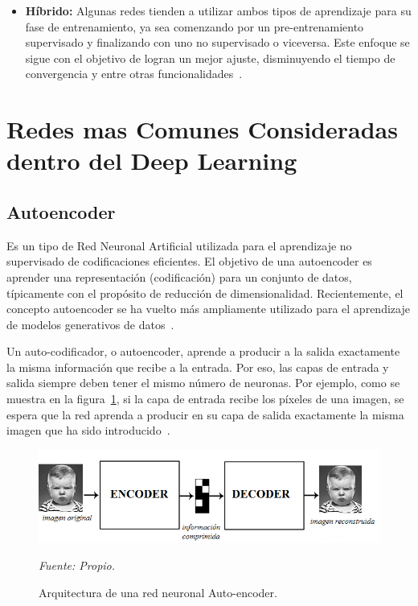 \begin{itemize}
\item \textbf{Híbrido: }
Algunas redes tienden a utilizar ambos tipos de aprendizaje para su fase de entrenamiento, ya sea comenzando por un pre-entrenamiento supervisado y finalizando con uno no supervisado o viceversa. Este enfoque se sigue con el objetivo de logran un mejor ajuste, disminuyendo el tiempo de convergencia y entre otras funcionalidades~\cite{18restrepo2015aplicacion}.
\end{itemize}

\section{Redes mas Comunes Consideradas dentro del Deep Learning}
\subsection{Autoencoder}
Es un tipo de Red Neuronal Artificial utilizada para el aprendizaje no supervisado de codificaciones eficientes. El objetivo de una autoencoder es aprender una representación (codificación) para un conjunto de datos, típicamente con el propósito de reducción de dimensionalidad. Recientemente, el concepto autoencoder se ha vuelto más ampliamente utilizado para el aprendizaje de modelos generativos de datos~\cite{28fAutoencoder}.

Un auto-codificador, o autoencoder, aprende a producir a la salida exactamente la misma información que recibe a la entrada. Por eso, las capas de entrada y salida siempre deben tener el mismo número de neuronas. Por ejemplo, como se muestra en la figura~\ref{fig:autoencoder}, si la capa de entrada recibe los píxeles de una imagen, se espera que la red aprenda a producir en su capa de salida exactamente la misma imagen que ha sido introducido~\cite{18restrepo2015aplicacion}.

\begin{figure}[H]
		\centering
		\includegraphics[width=150mm]{Imagenes/autoenconder.png}
		\caption{Arquitectura de una red neuronal Auto-encoder.}
		\vspace{0.15cm}
		\textit{Fuente: Propio.}
		\label{fig:autoencoder}
\end{figure}

